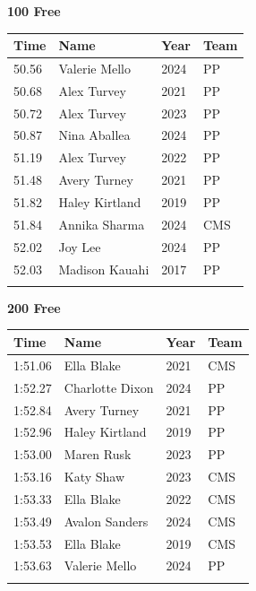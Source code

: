 \noindent\begin{minipage}[t]{0.98\textwidth}
\centering
\textbf{\textcolor{teamprimary}{100 Free}}\par
\vspace{0.5em}
\centering
\small
\renewcommand{\arraystretch}{1.0}
\setlength{\tabcolsep}{4pt}
\begin{tabular}{@{}p{2.5cm}p{4.5cm}p{1.5cm}p{2.5cm}@{}}
\toprule
\textbf{Time} & \textbf{Name} & \textbf{Year} & \textbf{Team} \\
\midrule
50.56 & Valerie Mello & 2024 & PP \\
50.68 & Alex Turvey & 2021 & PP \\
50.72 & Alex Turvey & 2023 & PP \\
50.87 & Nina Aballea & 2024 & PP \\
51.19 & Alex Turvey & 2022 & PP \\
51.48 & Avery Turney & 2021 & PP \\
51.82 & Haley Kirtland & 2019 & PP \\
51.84 & Annika Sharma & 2024 & CMS \\
52.02 & Joy Lee & 2024 & PP \\
52.03 & Madison Kauahi & 2017 & PP \\
\bottomrule
\vspace{0.5em}
\end{tabular}
\end{minipage}
\vspace{1.2em}
\noindent\begin{minipage}[t]{0.98\textwidth}
\centering
\textbf{\textcolor{teamprimary}{200 Free}}\par
\vspace{0.5em}
\centering
\small
\renewcommand{\arraystretch}{1.0}
\setlength{\tabcolsep}{4pt}
\begin{tabular}{@{}p{2.5cm}p{4.5cm}p{1.5cm}p{2.5cm}@{}}
\toprule
\textbf{Time} & \textbf{Name} & \textbf{Year} & \textbf{Team} \\
\midrule
1:51.06 & Ella Blake & 2021 & CMS \\
1:52.27 & Charlotte Dixon & 2024 & PP \\
1:52.84 & Avery Turney & 2021 & PP \\
1:52.96 & Haley Kirtland & 2019 & PP \\
1:53.00 & Maren Rusk & 2023 & PP \\
1:53.16 & Katy Shaw & 2023 & CMS \\
1:53.33 & Ella Blake & 2022 & CMS \\
1:53.49 & Avalon Sanders & 2024 & CMS \\
1:53.53 & Ella Blake & 2019 & CMS \\
1:53.63 & Valerie Mello & 2024 & PP \\
\bottomrule
\vspace{0.5em}
\end{tabular}
\end{minipage}
